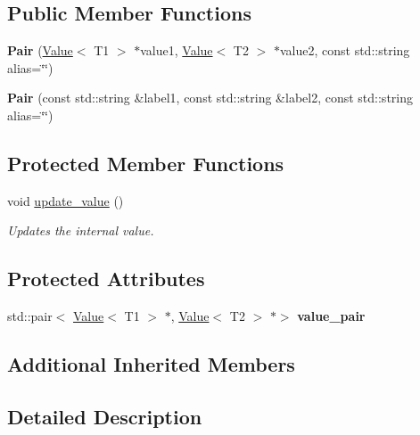 \subsection*{Public Member Functions}
\begin{DoxyCompactItemize}
\item 
\hypertarget{classfv_1_1Pair_a1846e7f1e986a2fb47e388330cdd8ff3}{}\label{classfv_1_1Pair_a1846e7f1e986a2fb47e388330cdd8ff3} 
{\bfseries Pair} (\hyperlink{classfv_1_1Value}{Value}$<$ T1 $>$ $\ast$value1, \hyperlink{classfv_1_1Value}{Value}$<$ T2 $>$ $\ast$value2, const std\+::string alias=\char`\"{}\char`\"{})
\item 
\hypertarget{classfv_1_1Pair_a9fad00f2ff4488f118455e1dcdd1c11a}{}\label{classfv_1_1Pair_a9fad00f2ff4488f118455e1dcdd1c11a} 
{\bfseries Pair} (const std\+::string \&label1, const std\+::string \&label2, const std\+::string alias=\char`\"{}\char`\"{})
\end{DoxyCompactItemize}
\subsection*{Protected Member Functions}
\begin{DoxyCompactItemize}
\item 
void \hyperlink{classfv_1_1Pair_ab3225f03f49240fc1547a5005f57b864}{update\+\_\+value} ()
\begin{DoxyCompactList}\small\item\em Updates the internal value. \end{DoxyCompactList}\end{DoxyCompactItemize}
\subsection*{Protected Attributes}
\begin{DoxyCompactItemize}
\item 
\hypertarget{classfv_1_1Pair_a6b7cd0e47693fbff80539b3a7df0ecab}{}\label{classfv_1_1Pair_a6b7cd0e47693fbff80539b3a7df0ecab} 
std\+::pair$<$ \hyperlink{classfv_1_1Value}{Value}$<$ T1 $>$ $\ast$, \hyperlink{classfv_1_1Value}{Value}$<$ T2 $>$ $\ast$$>$ {\bfseries value\+\_\+pair}
\end{DoxyCompactItemize}
\subsection*{Additional Inherited Members}


\subsection{Detailed Description}

